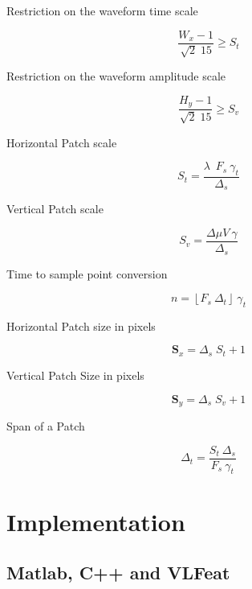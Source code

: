 Restriction on the waveform time scale

\begin{equation}
\frac{W_x-1}{\sqrt{2} \; 15}  \geq S_t 
\label{eq:restriction1}
\end{equation}

Restriction on the waveform amplitude scale

\begin{equation}
\frac{H_y-1}{\sqrt{2} \; 15}  \geq S_v 
\label{eq:restriction2}
\end{equation}

Horizontal Patch scale

\begin{equation}
S_t = \frac{ \lambda \;  \  F_s \ \gamma_t }{\Delta_s}
\label{eq:mapping2}
\end{equation}

Vertical Patch scale

\begin{equation}
S_v= \frac{\Delta \mu V \ \gamma}{\Delta_s} 
\label{eq:mapping1}
\end{equation}

Time to sample point conversion

\begin{equation}
n = \left\lfloor F_s \ \Delta_t \right\rfloor \ \gamma_t
\label{eq:mapping1}
\end{equation}

Horizontal Patch size in pixels

\begin{equation}
\mathbf{S}_x = \Delta_s \; S_t + 1
\label{eq:mapping2}
\end{equation}

Vertical Patch Size in pixels

\begin{equation}
\mathbf{S}_y = \Delta_s \; S_v + 1
\label{eq:mapping1}
\end{equation}

Span of a Patch

\begin{equation}
\Delta_t = \frac{S_t \ \Delta_s}{F_s \ \gamma_t} 
\label{eq:mapping1}
\end{equation}


\section{Implementation}

\subsection{Matlab, C++ and VLFeat}

